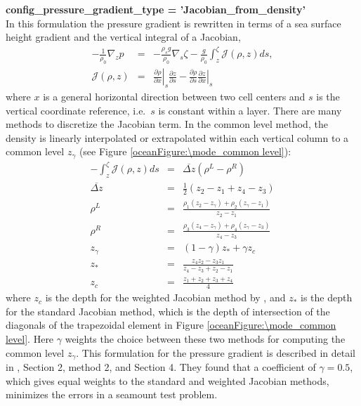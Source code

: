 {\bf \large config\_pressure\_gradient\_type = 'Jacobian\_from\_density'}\\
In this formulation the pressure gradient is rewritten in terms of a sea surface height gradient and the vertical integral of a Jacobian,
\begin{eqnarray}
\label{ocean:\mode_grad p Jacobian}
- \frac{1}{\rho_0}\nabla_z p &=& - \frac{\rho_s g}{\rho_0}\nabla_s \zeta - \frac{g}{\rho_0}\int_z^\zeta {\mathcal J}(\rho,z)ds, \\
{\mathcal J}(\rho,z) &=& \left. \frac{\partial \rho}{\partial x} \right|_s \frac{\partial z}{\partial s} 
 - \frac{\partial \rho}{\partial s}  \left. \frac{\partial z}{\partial x} \right|_s 
\end{eqnarray}
where $x$ is a general horizontal direction between two cell centers and $s$ is the vertical coordinate reference, i.e.\ $s$ is constant within a layer.  There are many methods to discretize the Jacobian term.  In the common level method, the density is linearly interpolated or extrapolated within each vertical column to a common level $z_\gamma$ (see Figure \ref{oceanFigure:\mode_common level}):
\begin{eqnarray}
- \int_z^\zeta {\mathcal J}(\rho,z)ds &=& \overline{\Delta z} \left( \rho^L - \rho^R \right) \\
\overline{\Delta z} &=& \frac{1}{2} \left(z_2-z_1 + z_4-z_3\right) \\
\rho^L &=& \frac{\rho_1\left(z_2-z_\gamma\right) + \rho_2\left(z_\gamma-z_1\right) }{z_2-z_1}\\
\rho^R &=& \frac{\rho_3\left(z_4-z_\gamma\right) + \rho_4\left(z_\gamma-z_3\right) }{z_4-z_3}\\
z_\gamma &=& \left(1-\gamma\right)z_* + \gamma z_c \\
z_* &=&  \frac{z_4 z_2-z_3z_1}{z_4-z_3 + z_2-z_1} \\
z_c &=&  \frac{z_1+z_2+z_3+z_4}{4} 
\end{eqnarray}
where $z_c$ is the depth for the weighted Jacobian method by \citet{Song98mwr}, and $z_*$ is the depth for the standard Jacobian method, which is the depth of intersection of the diagonals of the trapezoidal element in Figure \ref{oceanFigure:\mode_common level}.  Here $\gamma$ weights the choice between these two methods for computing the common level $z_\gamma$.  This formulation for the pressure gradient is described in detail in \citet{Shchepetkin_McWilliams03jgr}, Section 2, method 2, and Section 4.  They found that a coefficient of $\gamma=0.5$, which gives equal weights to the standard and weighted Jacobian methods, minimizes the errors in a seamount test problem.

